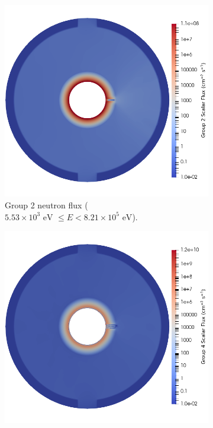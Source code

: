 \begin{figure}[H]
    \centering
    \begin{subfigure}[b]{0.495\textwidth}
        \centering
        \includegraphics[width=\textwidth]{images/demos/bwr_shield/neutron_field/group_2.png}
        \caption{Group 2 neutron flux ($5.53\times 10^{3}\text{ eV } \leq E < 8.21\times 10^{5}\text{ eV}$).}
        \label{fig:demo:bwr:neutron:g2}
    \end{subfigure}
    \hfill
    \begin{subfigure}[b]{0.495\textwidth}
        \centering
        \includegraphics[width=\textwidth]{images/demos/bwr_shield/neutron_field/group_4.png}

\end{subfigure}
\end{figure}
